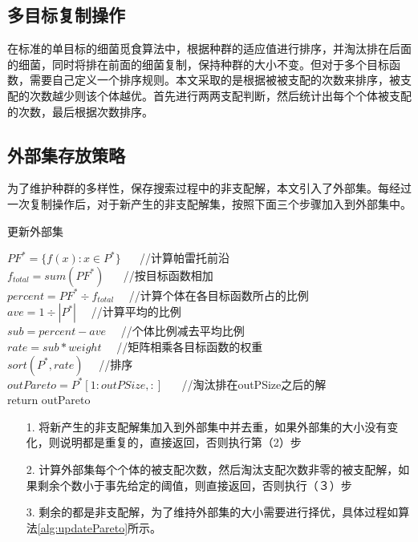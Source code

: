     \subsection{多目标复制操作}
    在标准的单目标的细菌觅食算法中，根据种群的适应值进行排序，并淘汰排在后面的细菌，同时将排在前面的细菌复制，保持种群的大小不变。但对于多个目标函数，需要自己定义一个排序规则。本文采取的是根据被被支配的次数来排序，被支配的次数越少则该个体越优。首先进行两两支配判断，然后统计出每个个体被支配的次数，最后根据次数排序。

    \subsection{外部集存放策略}
    为了维护种群的多样性，保存搜索过程中的非支配解，本文引入了外部集。每经过一次复制操作后，对于新产生的非支配解集，按照下面三个步骤加入到外部集中。
    \begin{algorithm}[htbp]
        \caption{更新外部集} \label{alg:updatePareto}
        $PF^*= \{f(x):x\in P^*\}$ 　 //计算帕雷托前沿 \\
        $f_{total} = sum(PF^*)$  　 //按目标函数相加\\
        $percent = PF^* \div　f_{total} $　 //计算个体在各目标函数所占的比例\\
        $ave = 1 \div |P^*|$　 //计算平均的比例\\
        $sub = percent - ave$　 //个体比例减去平均比例 \\
        $rate = sub \ast weight$　 //矩阵相乘各目标函数的权重\\
        $sort(P^*, rate)$　 //排序\\
        $outPareto = P^*[1:outPSize,:]$ 　 //淘汰排在outPSize之后的解\\
        return outPareto
    \end{algorithm}
    \begin{enumerate}
       \item[1.] 将新产生的非支配解集加入到外部集中并去重，如果外部集的大小没有变化，则说明都是重复的，直接返回，否则执行第（2）步
       \item[2.] 计算外部集每个个体的被支配次数，然后淘汰支配次数非零的被支配解，如果剩余个数小于事先给定的阈值，则直接返回，否则执行（３）步
       \item[3.] 剩余的都是非支配解，为了维持外部集的大小需要进行择优，具体过程如算法\ref{alg:updatePareto}所示。
    \end{enumerate} 
